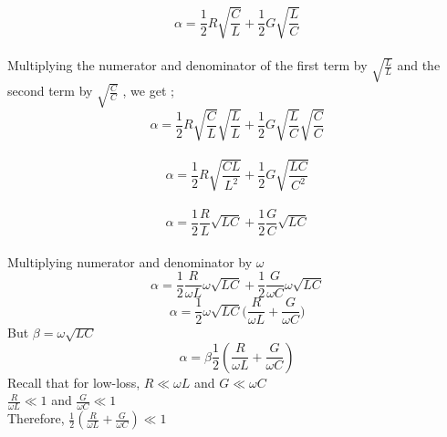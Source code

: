\begin{equation*}
\alpha =\frac{1}{2}R\sqrt{\frac{C}{L}} + \frac{1}{2}G\sqrt{\frac{L}{C}}	
\end{equation*}\\
Multiplying the numerator and denominator of the first term by $\sqrt{\frac{L}{L}}$ and the second term by $\sqrt{\frac{C}{C}}$ , we get ;
\begin{equation*}
\alpha = \frac{1}{2} R \sqrt{\frac{C}{L}} \sqrt{\frac{L}{L}} + \frac{1}{2} G \sqrt{\frac{L}{C}} \sqrt{\frac{C}{C}} 
\end{equation*}\\
\begin{equation*}
\alpha =  \frac{1}{2} R \sqrt{\frac{CL}{L^2}} + \frac{1}{2} G \sqrt{\frac{LC}{C^2}}	
\end{equation*}\\
\begin{equation*}
\alpha = \frac{1}{2} \frac{R}{L} \sqrt{LC} + \frac{1}{2} \frac{G}{C} \sqrt{LC}
\end{equation*}\\
Multiplying numerator and denominator by $\omega$\\
\begin{equation*}
\alpha = \frac{1}{2} \frac{R}{\omega L} \omega \sqrt{LC} + \frac{1}{2} \frac{G}{\omega C} \omega \sqrt{LC}
\end{equation*}
\begin{equation*}
\alpha = \frac{1}{2} \omega\sqrt{LC}{(\frac{R}{\omega L} + \frac{G}{\omega C}})
\end{equation*}
But $\beta = \omega \sqrt{LC}$\\
\begin{equation}
\alpha = \beta\frac{1}{2} ( \frac{R}{\omega L} + \frac{G}{\omega C})
\end{equation}
Recall that for low-loss, $R \ll \omega L$ and $G \ll \omega C$\\
$\frac{R}{\omega L} \ll 1$ and $\frac{G}{\omega C} \ll 1$\\
Therefore,  $\frac{1}{2} (\frac{R}{\omega L} + \frac{G}{\omega C}) \ll 1$\\

